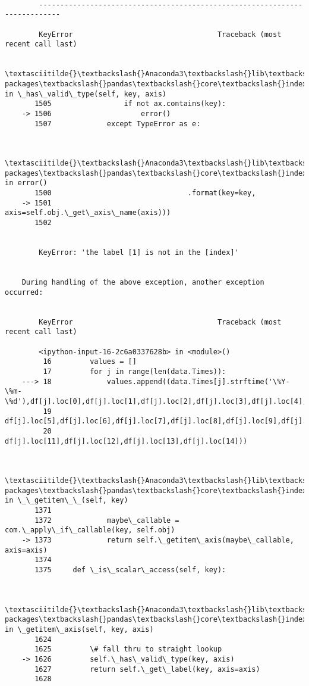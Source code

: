 \documentclass[11pt]{article}
\begin{document}
    \begin{Verbatim}[commandchars=\\\{\}]

        ---------------------------------------------------------------------------

        KeyError                                  Traceback (most recent call last)

        \textasciitilde{}\textbackslash{}Anaconda3\textbackslash{}lib\textbackslash{}site-packages\textbackslash{}pandas\textbackslash{}core\textbackslash{}indexing.py in \_has\_valid\_type(self, key, axis)
       1505                 if not ax.contains(key):
    -> 1506                     error()
       1507             except TypeError as e:
    

        \textasciitilde{}\textbackslash{}Anaconda3\textbackslash{}lib\textbackslash{}site-packages\textbackslash{}pandas\textbackslash{}core\textbackslash{}indexing.py in error()
       1500                                .format(key=key,
    -> 1501                                        axis=self.obj.\_get\_axis\_name(axis)))
       1502 
    

        KeyError: 'the label [1] is not in the [index]'

        
    During handling of the above exception, another exception occurred:
    

        KeyError                                  Traceback (most recent call last)

        <ipython-input-16-2c6a0337628b> in <module>()
         16         values = []
         17         for j in range(len(data.Times)):
    ---> 18             values.append((data.Times[j].strftime('\%Y-\%m-\%d'),df[j].loc[0],df[j].loc[1],df[j].loc[2],df[j].loc[3],df[j].loc[4],
         19                            df[j].loc[5],df[j].loc[6],df[j].loc[7],df[j].loc[8],df[j].loc[9],df[j].loc[10],
         20                            df[j].loc[11],df[j].loc[12],df[j].loc[13],df[j].loc[14]))
    

        \textasciitilde{}\textbackslash{}Anaconda3\textbackslash{}lib\textbackslash{}site-packages\textbackslash{}pandas\textbackslash{}core\textbackslash{}indexing.py in \_\_getitem\_\_(self, key)
       1371 
       1372             maybe\_callable = com.\_apply\_if\_callable(key, self.obj)
    -> 1373             return self.\_getitem\_axis(maybe\_callable, axis=axis)
       1374 
       1375     def \_is\_scalar\_access(self, key):
    

        \textasciitilde{}\textbackslash{}Anaconda3\textbackslash{}lib\textbackslash{}site-packages\textbackslash{}pandas\textbackslash{}core\textbackslash{}indexing.py in \_getitem\_axis(self, key, axis)
       1624 
       1625         \# fall thru to straight lookup
    -> 1626         self.\_has\_valid\_type(key, axis)
       1627         return self.\_get\_label(key, axis=axis)
       1628 
    


\end{Verbatim}
\end{document}
